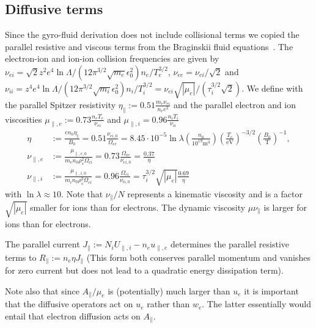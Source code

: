 \subsection{Diffusive terms}\label{sec:dissres}
Since the gyro-fluid derivation does not include collisional terms we
copied the parallel resistive and viscous terms from the Braginskii fluid equations~\cite{Braginskii1965}.
The electron-ion and ion-ion collision frequencies are given by
$\nu_{ei} = \sqrt{2} z^2 e^4 \ln \Lambda/ (12\pi^{3/2} \sqrt{m_e} \epsilon_0^2) n_e /T_e^{3/2}$, $\nu_{ee} = \nu_{ei}/\sqrt{2}$
and
$\nu_{ii} =  z^4 e^4 \ln \Lambda/ (12\pi^{3/2} \sqrt{m_i} \epsilon_0^2) n_i /T_i^{3/2} = \nu_{ei} \sqrt{|\mu_e|}/ ( \tau_i^{3/2} \sqrt{2})$.
We define with the parallel Spitzer resistivity
$\eta_\parallel := 0.51\frac{ m_e \nu_{ei}}{n_e e^2}$ and the parallel electron and ion viscosities
$\mu_{\parallel,e}:=0.73\frac{n_eT_e}{\nu_{ei}}$ and $\mu_{\parallel,i} = 0.96\frac{n_iT_i}{\nu_{ii}}$~\cite{Braginskii1965}
\begin{subequations}
\begin{align}
    \eta&:=\frac{en_0\eta_\parallel}{B_0} = 0.51\frac{\nu_{ei,0}}{\Omega_{ce}}=
    8.45\cdot 10^{-5}\ln \lambda \left(\frac{n_0}{10^{19}\text{m}^3}\right)
    \left(\frac{T_e}{\text{eV}}\right)^{-3/2}
    \left(\frac{B_0}{\text{T}}\right)^{-1},
    \label{eq:resistivity}\\
    \nu_{\parallel,e}&:=\frac{\mu_{\parallel,e,0}}{m_e n_0\rho_s^2\Omega_{ci}}
    = 0.73 \frac{\Omega_{ce}}{\nu_{ei,0}} = \frac{0.37}{\eta}
    \label{eq:nu_parallele}\\
    \nu_{\parallel,i}&:=\frac{\mu_{\parallel,i,0}}{m_i n_0 \rho_s^2\Omega_{ci}}
    = 0.96 \frac{\Omega_{ci}}{\nu_{ii,0}} = {\tau_i^{3/2}}{\sqrt{|\mu_e|}}
    \frac{0.69}{\eta}
    \label{eq:nu_paralleli}
\end{align}
\end{subequations}
with $\ln \lambda \approx 10$.
Note that $\nu_\parallel/N$ represents a kinematic viscosity and is a factor $\sqrt{|\mu_e|}$ smaller for ions than for electrons.
The dynamic viscosity $\mu\nu_\parallel$ is larger for ions than for electrons.

 The parallel current \(J_{\parallel}:=N_iU_{\parallel,i} - n_eu_{\parallel,e}\)
 determines the parallel resistive terms to $R_\parallel:= n_e\eta J_{\parallel}$
 (This form both conserves parallel momentum and vanishes for zero current but
 does not lead to a quadratic energy dissipation term).

 Note also that since $A_\parallel/\mu_e$ is (potentially) much larger than $u_e$
 it is important that the diffusive operators act on $u_e$ rather than $w_e$.
 The latter essentially would entail that electron diffusion acts on $A_\parallel$.


